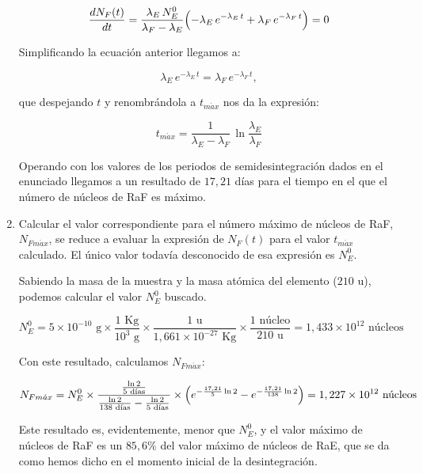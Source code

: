 \begin{enumerate}
    \begin{equation*}
        \frac{d N_F (t)}{dt} = \frac{\lambda_E\, N_E^0}{\lambda_F - \lambda_E}
        \Bigl(
        - \lambda_E \, e^{- \lambda_E\, t}  + \lambda_F \, e^{- \lambda_F\, t}
        \Bigr)  = 0
    \end{equation*}

    Simplificando la ecuación anterior llegamos a:

    \begin{equation*}
        \lambda_E \, e^{- \lambda_E\, t} = \lambda_F \, e^{- \lambda_F\, t},
    \end{equation*}

    que despejando $t$ y renombrándola a $t_{m\acute{a}x}$ nos da la expresión:

    \begin{equation*}
        t_{m\acute{a}x} = \frac{1}{ \lambda_E -  \lambda_F }\, \ln{\frac{\lambda_E}{\lambda_F}}
    \end{equation*}

    Operando con los valores de los periodos de semidesintegración dados en el enunciado llegamos a un resultado de $17,21$ días para el
    tiempo en el que el número de núcleos de RaF es máximo.


    \vspace{20px}

    \item Calcular el valor correspondiente para el número máximo de núcleos de RaF, $N_{Fm\acute{a}x}$, se reduce a evaluar la expresión de $N_F(t)$
    para el valor $ t_{m\acute{a}x} $ calculado.
    El único valor todavía desconocido de esa expresión es $N_E^0$.

    Sabiendo la masa de la muestra y la masa atómica del elemento ($210 $ u), podemos calcular el valor $N_E^0$ buscado.

    \begin{equation*}
        N_E^0 = 5 \times 10 ^{-10} \text{ g} \times
        \frac{1 \text{ Kg}}{10^3\text{ g}} \times
        \frac{1 \text{ u}}{1,661 \times 10^{-27}\text{ Kg}} \times
        \frac{1 \text{ núcleo}}{210 \text{ u}} = 1,433 \times 10^{12} \text{ núcleos}
    \end{equation*}

    Con este resultado, calculamos $N_{Fm\acute{a}x}$:

    \begin{equation*}
        N_{Fm\acute{a}x} = N_E^0 \times \frac{\frac{\ln{2}}{5 \text{ días}}}{\frac{\ln{2}}{138 \text{ días}} - \frac{\ln{2}}{5 \text{ días}}} \times
        \Bigl(
        e^{-   \frac{17,21}{5} \ln2} - e^{-\frac{17,21}{138} \ln2}
        \Bigr)  = 1,227 \times 10 ^{12} \text{ núcleos}
    \end{equation*}

    Este resultado es, evidentemente, menor que $N_E^0$, y el valor máximo de núcleos de RaF es
    un $85,6\%$ del valor máximo de núcleos de RaE, que se da como
    hemos dicho en el momento inicial de la desintegración.

\end{enumerate}


